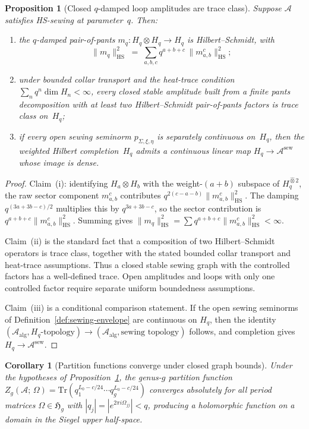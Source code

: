 \documentclass[11pt,reqno]{amsart}
\newtheorem{proposition}[theorem]{Proposition}
\newtheorem{corollary}[theorem]{Corollary}
\theoremstyle{definition}
\theoremstyle{remark}
\newcommand{\cA}{\mathcal{A}}
\newcommand{\HS}{\mathrm{HS}}
\newcommand{\Tr}{\mathrm{Tr}}
\newcommand{\fH}{\mathfrak{H}}
\numberwithin{equation}{section}
\begin{document}
\begin{proposition}[Closed $q$-damped loop amplitudes are trace
class]
\label{prop:closed-trace-class}
Suppose $\cA$ satisfies HS-sewing at parameter~$q$. Then:
\begin{enumerate}[label=\textup{(\roman*)}]
\item the $q$-damped pair-of-pants
$m_q \colon H_q \otimes H_q \to H_q$ is Hilbert--Schmidt, with
\[
\|m_q\|_{\HS}^2
\;=\;
\sum_{a,b,c} q^{a+b+c}\, \|m_{a,b}^c\|_{\HS}^2;
\]
\item under bounded collar transport and the heat-trace condition
$\sum_n q^n\dim H_n<\infty$, every closed stable amplitude built
from a finite pants decomposition with at least two
Hilbert--Schmidt pair-of-pants factors is trace class on~$H_q$;
\item if every open sewing seminorm
$p_{\Sigma,\xi,\eta}$ is separately continuous on~$H_q$, then
the weighted Hilbert completion~$H_q$ admits a continuous linear
map $H_q \to \cA^{\mathrm{sew}}$ whose image is dense.
\end{enumerate}
\end{proposition}

\begin{proof}
Claim~(i): identifying $H_a \otimes H_b$ with the
weight-$(a+b)$ subspace of $H_q^{\widehat{\otimes} 2}$,
the raw sector component $m_{a,b}^c$ contributes
$q^{2(c-a-b)}\|m_{a,b}^c\|_{\HS}^2$.  The damping
$q^{(3a+3b-c)/2}$ multiplies this by $q^{3a+3b-c}$, so the
sector contribution is $q^{a+b+c}\|m_{a,b}^c\|_{\HS}^2$.
Summing gives
$\|m_q\|_{\HS}^2 =
\sum q^{a+b+c}\|m_{a,b}^c\|_{\HS}^2 < \infty$.

Claim~(ii) is the standard fact that a composition of two
Hilbert--Schmidt operators is trace class, together with the stated
bounded collar transport and heat-trace assumptions. Thus a closed
stable sewing graph with the controlled factors has a well-defined
trace. Open amplitudes and loops with only one controlled factor
require separate uniform boundedness assumptions.

Claim~(iii) is a conditional comparison statement. If the open
sewing seminorms of Definition~\ref{def:sewing-envelope} are
continuous on $H_q$, then the identity
$(\cA_{\mathrm{alg}},H_q\text{-topology}) \to
(\cA_{\mathrm{alg}},\text{sewing topology})$ follows, and completion
gives $H_q \to \cA^{\mathrm{sew}}$.
\end{proof}

\begin{corollary}[Partition functions converge under closed
graph bounds]
\label{cor:partition-convergence}
Under the hypotheses of Proposition~\ref{prop:closed-trace-class},
the genus-$g$ partition function
$Z_g(\cA;\,\Omega)
= \Tr(q_1^{L_0 - c/24}\cdots q_g^{L_0 - c/24})$
converges absolutely for all period matrices
$\Omega \in \fH_g$ with
$|q_j| = |e^{2\pi i \Omega_{jj}}| < q$, producing a
holomorphic function on a domain in the Siegel upper
half-space.
\end{corollary}
\end{document}
